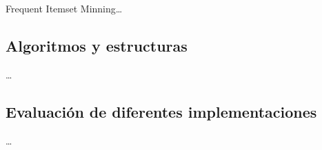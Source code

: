 Frequent Itemset Minning\ldots


\subsection{Algoritmos y estructuras}
\ldots





\subsection{Evaluación de diferentes implementaciones}
\ldots



